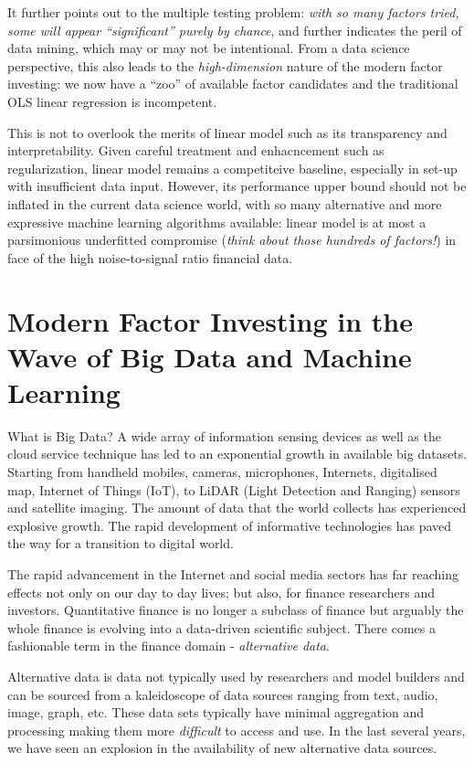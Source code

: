 \documentclass[
]{book}
\begin{document}
It further points out to the multiple testing problem: \emph{with so many factors tried, some will appear ``significant'' purely by chance}, and further indicates the peril of data mining, which may or may not be intentional. From a data science perspective, this also leads to the {\emph{high-dimension}} nature of the modern factor investing: we now have a ``zoo'' of available factor candidates and the traditional OLS linear regression is incompetent.

This is not to overlook the merits of linear model such as its transparency and interpretability. Given careful treatment and enhacncement such as regularization, linear model remains a competiteive baseline, especially in set-up with insufficient data input. However, its performance upper bound should not be inflated in the current data science world, with so many alternative and more expressive machine learning algorithms available: linear model is at most a parsimonious underfitted compromise (\emph{think about those hundreds of factors!}) in face of the high noise-to-signal ratio financial data.

\hypertarget{modern-factor-investing-in-the-wave-of-big-data-and-machine-learning}{%
\section{Modern Factor Investing in the Wave of Big Data and Machine Learning}\label{modern-factor-investing-in-the-wave-of-big-data-and-machine-learning}}

What is Big Data? A wide array of information sensing devices as well as the cloud service technique has led to an exponential growth in available big datasets. Starting from handheld mobiles, cameras, microphones, Internets, digitalised map, Internet of Things (IoT), to LiDAR (Light Detection and Ranging) sensors and satellite imaging. The amount of data that the world collects has experienced explosive growth. The rapid development of informative technologies has paved the way for a transition to digital world.

The rapid advancement in the Internet and social media sectors has far reaching effects not only on our day to day lives; but also, for finance researchers and investors. Quantitative finance is no longer a subclass of finance but arguably the whole finance is evolving into a data-driven scientific subject. There comes a fashionable term in the finance domain - {\emph{alternative data}}.

Alternative data is data not typically used by researchers and model builders and can be sourced from a kaleidoscope of data sources ranging from text, audio, image, graph, etc. These data sets typically have minimal aggregation and processing making them more {\emph{difficult}} to access and use. In the last several years, we have seen an explosion in the availability of new alternative data sources.
\end{document}
